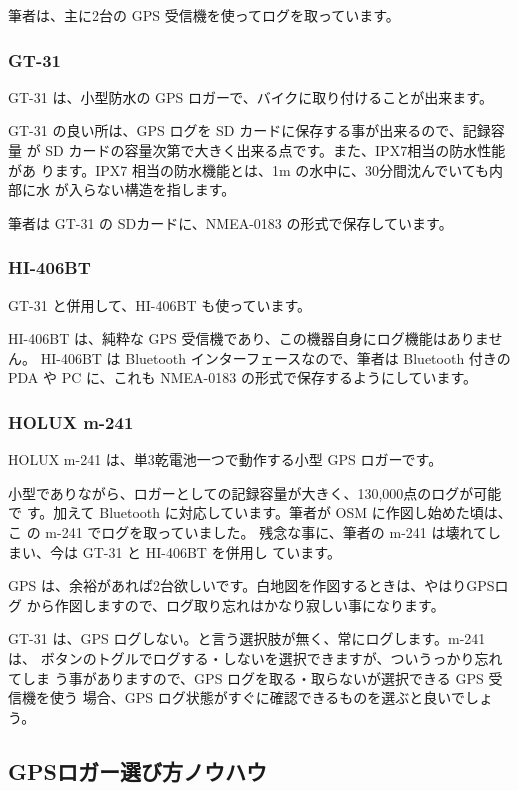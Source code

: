 \documentclass[mingoth,a4paper]{jsarticle}
\begin{document}
筆者は、主に2台の GPS 受信機を使ってログを取っています。

\subsubsection{GT-31}

GT-31 は、小型防水の GPS ロガーで、バイクに取り付けることが出来ます。

GT-31 の良い所は、GPS ログを SD カードに保存する事が出来るので、記録容量
が SD カードの容量次第で大きく出来る点です。また、IPX7相当の防水性能があ
ります。IPX7 相当の防水機能とは、1m の水中に、30分間沈んでいても内部に水
が入らない構造を指します。

筆者は GT-31 の SDカードに、NMEA-0183 の形式で保存しています。

\subsubsection{HI-406BT}

GT-31 と併用して、HI-406BT も使っています。

HI-406BT は、純粋な GPS 受信機であり、この機器自身にログ機能はありません。
HI-406BT は Bluetooth インターフェースなので、筆者は Bluetooth 付きの
PDA や PC に、これも NMEA-0183 の形式で保存するようにしています。

\subsubsection{HOLUX m-241}
HOLUX m-241 は、単3乾電池一つで動作する小型 GPS ロガーです。

小型でありながら、ロガーとしての記録容量が大きく、130,000点のログが可能で
す。加えて Bluetooth に対応しています。筆者が OSM に作図し始めた頃は、こ
の m-241 でログを取っていました。
残念な事に、筆者の m-241 は壊れてしまい、今は GT-31 と HI-406BT を併用し
ています。

GPS は、余裕があれば2台欲しいです。白地図を作図するときは、やはりGPSログ
から作図しますので、ログ取り忘れはかなり寂しい事になります。

GT-31 は、GPS ログしない。と言う選択肢が無く、常にログします。m-241 は、
ボタンのトグルでログする・しないを選択できますが、ついうっかり忘れてしま
う事がありますので、GPS ログを取る・取らないが選択できる GPS 受信機を使う
場合、GPS ログ状態がすぐに確認できるものを選ぶと良いでしょう。

\subsection{GPSロガー選び方ノウハウ}
\end{document}
